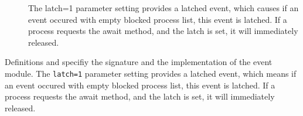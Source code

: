 \documentclass[a4paper,12pt,twoside,english]{article}
\begin{document}
\begin{description}
\item[] $ $\\
The latch=1 parameter setting provides a latched event, which causes if an event occured with empty blocked process list, this event is latched. If a process
requests the await method, and the latch is set, it will immediately released.


\end{description}
Definitions  and  specifiy the signature and the implementation of the event module. The {\tt latch=1} parameter setting
provides a latched event, which means if an event occured with empty blocked process list, this event is latched. If a process requests the await method, and
the latch is set, it will immediately released.
\end{document}
